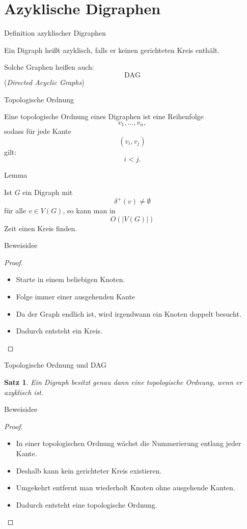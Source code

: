 \documentclass{beamer}
\newtheorem{satz}{Satz}
\begin{document}
\section{Azyklische Digraphen}
\begin{frame}{Definition azyklischer Digraphen}
\begin{definition}
Ein Digraph heißt azyklisch, falls er keinen gerichteten Kreis enthält.
\end{definition}
\vspace{0.5cm}
Solche Graphen heißen auch:
\[\text{DAG}\]
(\emph{Directed Acyclic Graphs})
\end{frame}
\begin{frame}{Topologische Ordnung}
\begin{definition}
Eine topologische Ordnung eines Digraphen ist eine Reihenfolge
\[v_1,\dots,v_n,\]
sodass für jede Kante
\[(v_i,v_j)\]
gilt:
\[i<j.\]
\end{definition}
\end{frame}
\begin{frame}{Lemma}
\begin{lemma}
Ist \(G\) ein Digraph mit
\[\delta^+(v)\neq\emptyset\]
für alle \(v\in V(G)\), so kann man in
\[O(|V(G)|)\]
Zeit einen Kreis finden.
\end{lemma}
\end{frame}
\begin{frame}{Beweisidee}
\begin{proof}
\begin{itemize}
    \item Starte in einem beliebigen Knoten.
    \item Folge immer einer ausgehenden Kante
    \item Da der Graph endlich ist, wird irgendwann ein Knoten doppelt besucht.
    \item Dadurch entsteht ein Kreis.
\end{itemize}
\end{proof}
\end{frame}
\begin{frame}{Topologische Ordnung und DAG}
\begin{satz}
Ein Digraph besitzt genau dann eine topologische Ordnung, wenn er azyklisch ist.
\end{satz}
\end{frame}
\begin{frame}{Beweisidee}
\begin{proof}
\begin{itemize}
    \item In einer topologischen Ordnung wächst die Nummerierung entlang jeder Kante.
    \item Deshalb kann kein gerichteter Kreis existieren.
    \item Umgekehrt entfernt man wiederholt Knoten ohne ausgehende Kanten.
    \item Dadurch entsteht eine topologische Ordnung.
\end{itemize}
\end{proof}
\end{frame}
\end{document}
